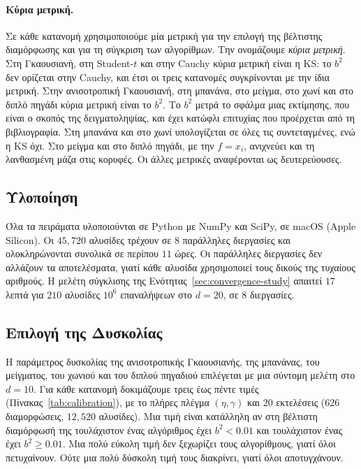 \paragraph{Κύρια μετρική.}
\label{par:primary-metric}
Σε κάθε κατανομή χρησιμοποιούμε μία μετρική για την επιλογή της βέλτιστης διαμόρφωσης
και για τη σύγκριση των αλγορίθμων. Την ονομάζουμε \emph{κύρια μετρική}. Στη Γκαουσιανή, στη Student-$t$ και στην
Cauchy κύρια μετρική είναι η KS: το $b^2$ δεν ορίζεται στην Cauchy, και έτσι οι τρεις
κατανομές συγκρίνονται με την ίδια μετρική. Στην ανισοτροπική Γκαουσιανή, στη μπανάνα,
στο μείγμα, στο χωνί και στο διπλό πηγάδι κύρια μετρική είναι το $b^2$. Το $b^2$
μετρά το σφάλμα μιας εκτίμησης, που είναι ο σκοπός της δειγματοληψίας, και έχει
κατώφλι επιτυχίας που προέρχεται από τη βιβλιογραφία. Στη μπανάνα και στο
χωνί υπολογίζεται σε όλες τις συντεταγμένες, ενώ η KS όχι. Στο μείγμα και στο διπλό
πηγάδι, με την $f = x_i$, ανιχνεύει και τη λανθασμένη μάζα στις κορυφές. Οι άλλες μετρικές
αναφέρονται ως δευτερεύουσες.

\subsection{Υλοποίηση}

Όλα τα πειράματα υλοποιούνται σε Python με NumPy και SciPy, σε macOS (Apple
Silicon). Οι $45{,}720$ αλυσίδες τρέχουν σε $8$ παράλληλες διεργασίες και ολοκληρώνονται
συνολικά σε περίπου $11$ ώρες. Οι παράλληλες διεργασίες δεν αλλάζουν τα αποτελέσματα,
γιατί κάθε αλυσίδα χρησιμοποιεί τους δικούς της τυχαίους αριθμούς. Η μελέτη
σύγκλισης της Ενότητας~\ref{sec:convergence-study} απαιτεί $17$ λεπτά για $210$
αλυσίδες $10^6$ επαναλήψεων στο $d=20$, σε $8$ διεργασίες.

\subsection{Επιλογή της Δυσκολίας}
\label{sec:calibration}

Η παράμετρος δυσκολίας της ανισοτροπικής Γκαουσιανής, της μπανάνας, του
μείγματος, του χωνιού και του διπλού πηγαδιού επιλέγεται με μια
σύντομη μελέτη στο $d=10$. Για κάθε κατανομή δοκιμάζουμε τρεις έως πέντε τιμές
(Πίνακας~\ref{tab:calibration}), με το πλήρες πλέγμα $(\eta, \gamma)$ και $20$
εκτελέσεις ($626$ διαμορφώσεις, $12{,}520$ αλυσίδες). Μια τιμή είναι κατάλληλη αν
στη βέλτιστη διαμόρφωσή της τουλάχιστον ένας αλγόριθμος έχει $b^2 < 0.01$ και
τουλάχιστον ένας έχει $b^2 \ge 0.01$. Μια πολύ εύκολη τιμή δεν ξεχωρίζει τους
αλγορίθμους, γιατί όλοι πετυχαίνουν. Ούτε μια πολύ δύσκολη τιμή τους διακρίνει,
γιατί όλοι αποτυγχάνουν.

